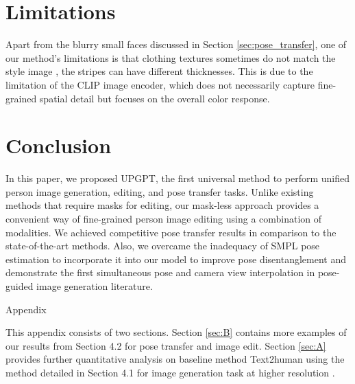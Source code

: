 \documentclass[10pt,twocolumn,letterpaper]{article}
\begin{document}
\section{Limitations}
Apart from the blurry small faces discussed in Section \ref{sec:pose_transfer}, one of our method's limitations is that clothing textures sometimes do not match the style image \eg, the stripes can have different thicknesses. This is due to the limitation of the CLIP image encoder, which does not necessarily capture fine-grained spatial detail but focuses on the overall color response. 


\section{Conclusion}
In this paper, we proposed UPGPT, the first universal method to perform unified person image generation, editing, and pose transfer tasks. Unlike existing methods that require masks for editing, our mask-less approach provides a convenient way of fine-grained person image editing using a combination of modalities. We achieved competitive pose transfer results in comparison to the state-of-the-art methods. Also, we overcame the inadequacy of SMPL pose estimation to incorporate it into our model to improve pose disentanglement and demonstrate the first simultaneous pose and camera view interpolation in pose-guided image generation literature.

\clearpage
{\small


}

\clearpage
\renewcommand\thesection{\Alph{section}}
\renewcommand\thefigure{\thesection.\arabic{figure}}
\setcounter{section}{0} 
\setcounter{figure}{0} 
\onecolumn
\begin{center}
    {\huge Appendix}
\end{center}
This appendix consists of two sections. Section \ref{sec:B} contains more  examples of our results from Section 4.2 for pose transfer and image edit. Section \ref{sec:A} provides further quantitative analysis on baseline method Text2human using the method detailed in Section 4.1 for image generation task at higher resolution . 
\end{document}
